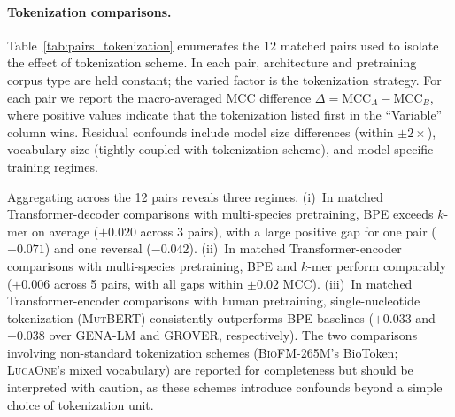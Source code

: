 \documentclass{article}
\theoremstyle{plain}
\theoremstyle{definition}
\theoremstyle{remark}
\begin{document}
\paragraph{Tokenization comparisons.}
\label{subsec:tokenization_controlled}
Table~\ref{tab:pairs_tokenization} enumerates the $12$ matched pairs
used to isolate the effect of tokenization scheme. In each pair,
architecture and pretraining corpus type are held constant; the varied
factor is the tokenization strategy. For each pair we report the
macro-averaged MCC difference $\Delta = \text{MCC}_A -
\text{MCC}_B$, where positive values indicate that the tokenization
listed first in the ``Variable'' column wins. Residual confounds include
model size differences (within $\pm 2\times$), vocabulary size (tightly
coupled with tokenization scheme), and model-specific training regimes.

Aggregating across the 12 pairs reveals three regimes. (i)~In matched
Transformer-decoder comparisons with multi-species pretraining, BPE
exceeds $k$-mer on average ($+0.020$ across 3 pairs), with a large
positive gap for one pair ($+0.071$) and one reversal ($-0.042$).
(ii)~In matched Transformer-encoder comparisons with multi-species
pretraining, BPE and $k$-mer perform comparably ($+0.006$ across 5
pairs, with all gaps within $\pm 0.02$ MCC).
(iii)~In matched Transformer-encoder comparisons with human
pretraining, single-nucleotide tokenization (\textsc{MutBERT})
consistently outperforms BPE baselines ($+0.033$ and $+0.038$ over
\textsc{GENA-LM} and \textsc{GROVER}, respectively). The two
comparisons involving non-standard tokenization schemes
(\textsc{BioFM-265M}'s BioToken; \textsc{LucaOne}'s mixed vocabulary)
are reported for completeness but should be interpreted with caution,
as these schemes introduce confounds beyond a simple choice of
tokenization unit.
\end{document}
